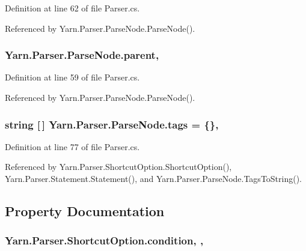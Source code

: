 Definition at line 62 of file Parser.\-cs.



Referenced by Yarn.\-Parser.\-Parse\-Node.\-Parse\-Node().

\hypertarget{a00148_af313a82103fcc2ff5a177dbb06b92f7b}{
\subsubsection[{parent}]{ Yarn.\-Parser.\-Parse\-Node.\-parent\hspace{0.3cm}{\ttfamily [package]}, {\ttfamily [inherited]}}}\label{a00148_af313a82103fcc2ff5a177dbb06b92f7b}


Definition at line 59 of file Parser.\-cs.



Referenced by Yarn.\-Parser.\-Parse\-Node.\-Parse\-Node().

\hypertarget{a00148_a58b3a15788fd2d4127d73619dc6d04ae}{
\subsubsection[{tags}]{\setlength{\rightskip}{0pt plus 5cm}string \mbox{[}$\,$\mbox{]} Yarn.\-Parser.\-Parse\-Node.\-tags = \{\}\hspace{0.3cm}{\ttfamily [package]}, {\ttfamily [inherited]}}}\label{a00148_a58b3a15788fd2d4127d73619dc6d04ae}


Definition at line 77 of file Parser.\-cs.



Referenced by Yarn.\-Parser.\-Shortcut\-Option.\-Shortcut\-Option(), Yarn.\-Parser.\-Statement.\-Statement(), and Yarn.\-Parser.\-Parse\-Node.\-Tags\-To\-String().



\subsection{Property Documentation}
\hypertarget{a00159_a31ece7f65af1e43961b68ba0275cdfaf}{
\subsubsection[{condition}]{ Yarn.\-Parser.\-Shortcut\-Option.\-condition\hspace{0.3cm}{\ttfamily [get]}, {\ttfamily [set]}, {\ttfamily [package]}}}\label{a00159_a31ece7f65af1e43961b68ba0275cdfaf}


